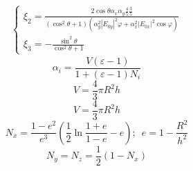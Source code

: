 \documentclass[12pt]{article}
\begin{document}
\begin{large}
\begin{eqnarray*}
\begin{cases}
        \xi_2 = \frac{2 \cos \theta \alpha_x \alpha_y \frac{4}{5} \frac{3}{5}}{\left( \cos^2 \theta + 1 \right)\left( \alpha_y^2 |E_{0y}|^2 \varphi + \alpha_x^2 |E_{0x}|^2 \cos \varphi \right)} \\
        \xi_3 = - \frac{\sin^2 \theta}{\cos^2 \theta + 1}
    \end{cases}
\end{eqnarray*}
\[
    \alpha_i = \frac{V \left( \varepsilon - 1 \right)}{1 + \left( \varepsilon - 1 \right) N_i}
\]
\[
    V = \frac{4}{3}\pi R^2 h
\]
\[
    V = \frac{4}{3}\pi R^2 h
\]
\[
    N_x = \frac{1-e^2}{e^3}\left( \frac{1}{2} \ln \frac{1+e}{1-e} - e \right) ; \, \, \, e = 1 - \frac{R^2}{h^2}
\]
\[
    N_y = N_z = \frac{1}{2} \left( 1 - N_x \right)
\]
\par
\par
\end{large}
\end{document}
